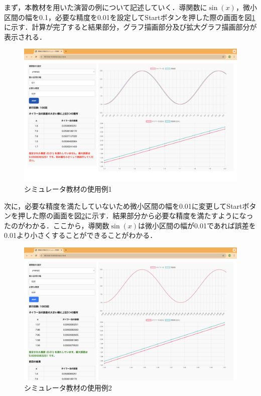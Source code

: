 \documentclass[a4paper, 12pt]{ltjsarticle}
\begin{document}
\clearpage

まず，本教材を用いた演習の例について記述していく．導関数に$\sin(x)$，微小区間の幅を0.1，必要な精度を0.01を設定してStartボタンを押した際の画面を図\ref{fig:シミュレータ教材の使用例1}に示す．計算が完了すると結果部分，グラフ描画部分及び拡大グラフ描画部分が表示される．

\begin{figure}[h]
\begin{center}
\includegraphics[clip,width=\textwidth,keepaspectratio]{sim-sample2.png}
\end{center}
\caption{シミュレータ教材の使用例1}
\label{fig:シミュレータ教材の使用例1}
\end{figure}

\clearpage

次に，必要な精度を満たしていないため微小区間の幅を0.01に変更してStartボタンを押した際の画面を図\ref{fig:シミュレータ教材の使用例2}に示す．結果部分から必要な精度を満たすようになったのがわかる．ここから，導関数$\sin(x)$は微小区間の幅が0.01であれば誤差を0.01より小さくすることができることがわかる．

\begin{figure}[h]
\begin{center}
\includegraphics[clip,width=\textwidth,keepaspectratio]{sim-sample3.png}
\end{center}
\caption{シミュレータ教材の使用例2}
\label{fig:シミュレータ教材の使用例2}
\end{figure}
\end{document}
